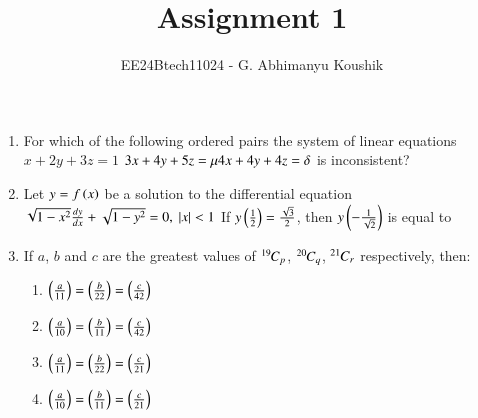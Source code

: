 \documentclass[journal,12pt,onecolumn]{IEEEtran}
\theoremstyle{remark}
\begin{document}
\title{Assignment 1}
\author{EE24Btech11024 - G. Abhimanyu Koushik}
\maketitle
\renewcommand{\thefigure}{\theenumi}
\renewcommand{\thetable}{\theenumi}
\begin{enumerate}
\item For which of the following ordered pairs \brak{\mu,\delta} the system of linear equations\newline
$x+2y+3z=1$\newline
$3x+4y+5z=\mu\newline
4x+4y+4z=\delta$\newline
is inconsistent?
\begin{enumerate}
\end{enumerate}

\item Let $y=f\left(x\right)$ be a solution to the differential equation\newline
$\sqrt{1-x^2}\frac{dy}{dx}+\sqrt{1-y^2} = 0 \text{, } \left\vert x\right\vert<1$\newline
If $y\left(\frac{1}{2}\right) = \frac{\sqrt{3}}{2}$, then $y\left(-\frac{1}{\sqrt{2}}\right)$ is equal to
\begin{enumerate}
\end{enumerate}

\item If $a$, $b$ and $c$ are the greatest values of ${{}^{19}\mkern-1muC_{p}}$, ${{}^{20}\mkern-1muC_{q}}$, ${{}^{21}\mkern-1muC_{r}}$ respectively, then:
\begin{enumerate}
\item $\left(\frac{a}{11}\right) = \left(\frac{b}{22}\right) = \left(\frac{c}{42}\right)$
\item $\left(\frac{a}{10}\right) = \left(\frac{b}{11}\right) = \left(\frac{c}{42}\right)$
\item $\left(\frac{a}{11}\right) = \left(\frac{b}{22}\right) = \left(\frac{c}{21}\right)$
\item $\left(\frac{a}{10}\right) = \left(\frac{b}{11}\right) = \left(\frac{c}{21}\right)$
\end{enumerate}


\end{enumerate}
\end{document}
